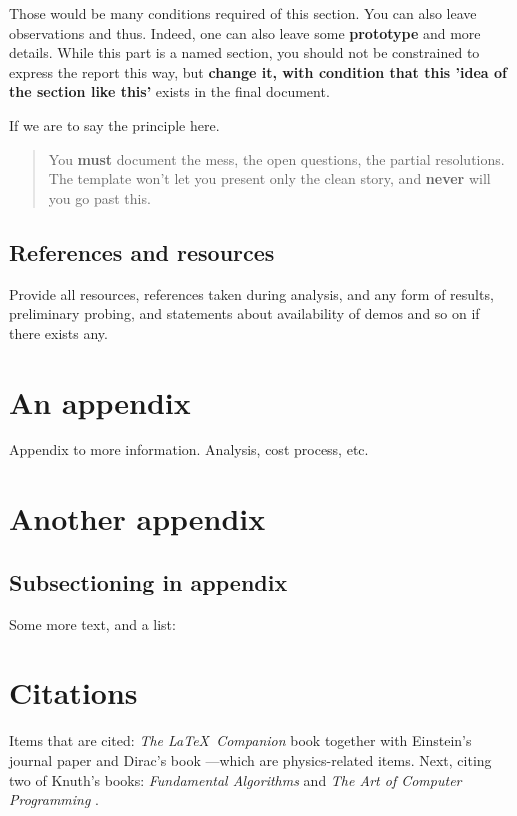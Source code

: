 \documentclass[10pt,a4paper]{article}
\begin{document}
Those would be many conditions required of this section. You can also leave observations and thus. Indeed, one can also leave some \textbf{prototype} and more details. While this part is a named section, you should not be constrained to express the report this way, but \textbf{change it, with condition that this 'idea of the section like this'} exists in the final document. 

If we are to say the principle here. 

\begin{quote}
    You \textbf{must} document the mess, the open questions, the partial resolutions. The template won't let you present only the clean story, and \textbf{never} will you go past this.
\end{quote}

\subsection{References and resources}

Provide all resources, references taken during analysis, and any form of results, preliminary probing, and statements about availability of demos and so on if there exists any.

\clearpage

% 
% 

\appendix

\section{An appendix}

Appendix to more information. Analysis, cost process, etc. 

\section{Another appendix}

\subsection*{Subsectioning in appendix}

Some more text, and a list:

\blindenumerate



\section{Citations}
Items that are cited: \textit{The \LaTeX\ Companion} book \cite{latexcompanion} together with Einstein's journal paper \cite{einstein} and Dirac's book \cite{dirac}---which are physics-related items. Next, citing two of Knuth's books: \textit{Fundamental Algorithms} \cite{knuth-fa} and \textit{The Art of Computer Programming} \cite{knuthwebsite}.
\end{document}
